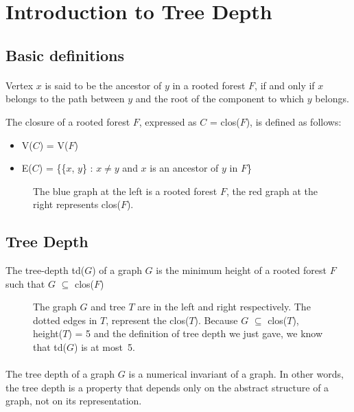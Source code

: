 \section{Introduction to Tree Depth}

\subsection{Basic definitions}

\paragraph{}
Vertex $x$ is said to be the ancestor of $y$ in a rooted forest $F$, if and only if $x$ belongs to the path between $y$ and the root of the component to which $y$ belongs.

\begin{definition}
The closure of a rooted forest $F$, expressed as $C$ = clos($F$), is defined as follows:
\begin{itemize}
  \item V($C$) = V($F$)
  \item E($C$) = \{\{$x$, $y$\} : $x \neq y$ and $x$ is an ancestor of $y$ in $F$\}
\end{itemize}
\end{definition}
\begin{figure}[h]

\caption{The blue graph at the left is a rooted forest $F$, the red graph at the right represents clos($F$).}
\end{figure}

\subsection{Tree Depth}

\begin{definition}
The tree-depth td($G$) of a graph $G$ is the minimum height of a rooted forest $F$ such that $G$ $\subseteq$ clos($F$)
\end{definition}

\begin{figure}[H]

\caption{The graph $G$ and tree $T$ are in the left and right respectively. The dotted edges in $T$, represent the clos($T$). Because $G$ $\subseteq$ clos($T$), height($T$) = 5 and the definition of tree depth we just gave, we know that td($G$) is at most~5.\label{fig:3d-cube}}
\end{figure}
\paragraph{}
The tree depth of a graph $G$ is a numerical invariant of a graph. In other words, the tree depth is a property that depends only  on the abstract structure of a graph, not on its representation.	

